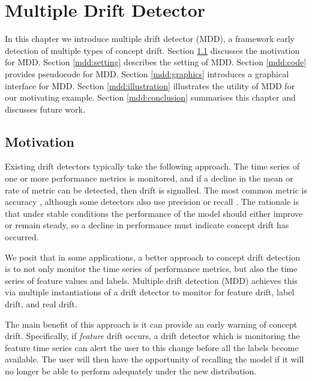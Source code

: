 \chapter{Multiple Drift Detector} \label{chapt:MDD}

In this chapter we introduce multiple drift detector (MDD), a framework early detection of multiple types of concept drift. Section \ref{mdd:motivation} discusses the motivation for MDD. Section \ref{mdd:setting} describes the setting of MDD. Section \ref{mdd:code} provides pseudocode for MDD. Section \ref{mdd:graphics} introduces a graphical interface for MDD. Section \ref{mdd:illustration} illustrates the utility of MDD for our motivating example. Section \ref{mdd:conclusion} summarises this chapter and discusses future work.


\section{Motivation} \label{mdd:motivation}

Existing drift detectors typically take the following approach. The time series of one or more performance metrics is monitored, and if a decline in the mean or rate of metric can be detected, then drift is signalled. The most common metric is accuracy \cite{DDM}\cite{EDDM}\cite{ADWIN}, although some detectors also use precision or recall \cite{LFR}\cite{klinkenberg_renz}\cite{DDM-OCIb}. The rationale is that under stable conditions the performance of the model should either improve or remain steady, so a decline in performance must indicate concept drift has occurred.

We posit that in some applications, a better approach to concept drift detection is to not only monitor the time series of  performance metrics, but also the time series of feature values and labels. Multiple drift detection (MDD) achieves this via multiple instantiations of a drift detector to monitor for feature drift, label drift, and real drift.

The main benefit of this approach is it can provide an early warning of concept drift. Specifically, if {\it feature} drift occurs, a drift detector which is monitoring the feature time series can alert the user to this change before all the labels become available. The user will then have the opportunity of recalling the model if it will no longer be able to perform adequately under the new distribution. 

